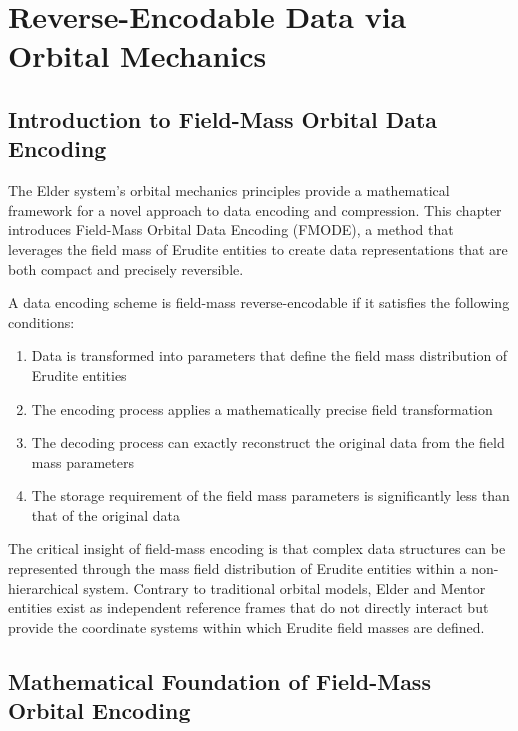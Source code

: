 \chapter{Reverse-Encodable Data via Orbital Mechanics}

\section{Introduction to Field-Mass Orbital Data Encoding}

The Elder system's orbital mechanics principles provide a mathematical framework for a novel approach to data encoding and compression. This chapter introduces Field-Mass Orbital Data Encoding (FMODE), a method that leverages the field mass of Erudite entities to create data representations that are both compact and precisely reversible.

\begin{definition}
A data encoding scheme is field-mass reverse-encodable if it satisfies the following conditions:
\begin{enumerate}
    \item Data is transformed into parameters that define the field mass distribution of Erudite entities
    \item The encoding process applies a mathematically precise field transformation
    \item The decoding process can exactly reconstruct the original data from the field mass parameters
    \item The storage requirement of the field mass parameters is significantly less than that of the original data
\end{enumerate}
\end{definition}

The critical insight of field-mass encoding is that complex data structures can be represented through the mass field distribution of Erudite entities within a non-hierarchical system. Contrary to traditional orbital models, Elder and Mentor entities exist as independent reference frames that do not directly interact but provide the coordinate systems within which Erudite field masses are defined.

\section{Mathematical Foundation of Field-Mass Orbital Encoding}


